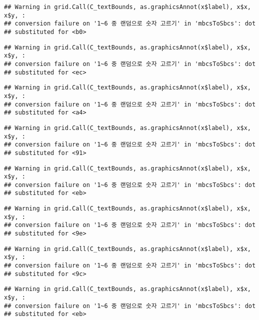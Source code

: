 \documentclass[]{book}
\begin{document}
\begin{verbatim}
## Warning in grid.Call(C_textBounds, as.graphicsAnnot(x$label), x$x, x$y, :
## conversion failure on '1~6 중 랜덤으로 숫자 고르기' in 'mbcsToSbcs': dot
## substituted for <b0>
\end{verbatim}

\begin{verbatim}
## Warning in grid.Call(C_textBounds, as.graphicsAnnot(x$label), x$x, x$y, :
## conversion failure on '1~6 중 랜덤으로 숫자 고르기' in 'mbcsToSbcs': dot
## substituted for <ec>
\end{verbatim}

\begin{verbatim}
## Warning in grid.Call(C_textBounds, as.graphicsAnnot(x$label), x$x, x$y, :
## conversion failure on '1~6 중 랜덤으로 숫자 고르기' in 'mbcsToSbcs': dot
## substituted for <a4>
\end{verbatim}

\begin{verbatim}
## Warning in grid.Call(C_textBounds, as.graphicsAnnot(x$label), x$x, x$y, :
## conversion failure on '1~6 중 랜덤으로 숫자 고르기' in 'mbcsToSbcs': dot
## substituted for <91>
\end{verbatim}

\begin{verbatim}
## Warning in grid.Call(C_textBounds, as.graphicsAnnot(x$label), x$x, x$y, :
## conversion failure on '1~6 중 랜덤으로 숫자 고르기' in 'mbcsToSbcs': dot
## substituted for <eb>
\end{verbatim}

\begin{verbatim}
## Warning in grid.Call(C_textBounds, as.graphicsAnnot(x$label), x$x, x$y, :
## conversion failure on '1~6 중 랜덤으로 숫자 고르기' in 'mbcsToSbcs': dot
## substituted for <9e>
\end{verbatim}

\begin{verbatim}
## Warning in grid.Call(C_textBounds, as.graphicsAnnot(x$label), x$x, x$y, :
## conversion failure on '1~6 중 랜덤으로 숫자 고르기' in 'mbcsToSbcs': dot
## substituted for <9c>
\end{verbatim}

\begin{verbatim}
## Warning in grid.Call(C_textBounds, as.graphicsAnnot(x$label), x$x, x$y, :
## conversion failure on '1~6 중 랜덤으로 숫자 고르기' in 'mbcsToSbcs': dot
## substituted for <eb>
\end{verbatim}
\end{document}
